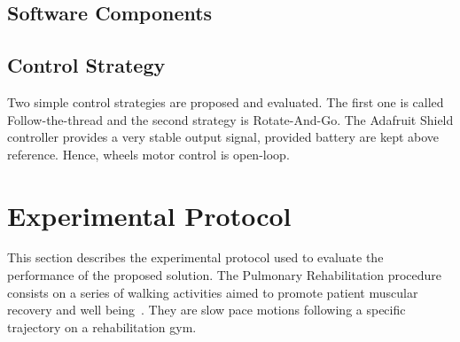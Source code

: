 \documentclass[journal]{IEEEtran}
\begin{document}


%
%
%
%


\subsection{Software Components}

\subsection{Control Strategy}

Two simple control strategies are proposed and evaluated.  The first one is called Follow-the-thread and the second strategy is Rotate-And-Go.  The Adafruit Shield controller provides a very stable output signal, provided battery are kept above reference.  Hence, wheels motor control is open-loop.

\section{Experimental Protocol} \label{experimental}

This section describes the experimental protocol used to evaluate the performance of the proposed solution.  The Pulmonary Rehabilitation procedure consists on a series of walking activities aimed to promote patient muscular recovery and well being~\cite{Wu2012}. They are slow pace motions following a specific trajectory on a rehabilitation gym.
\end{document}

